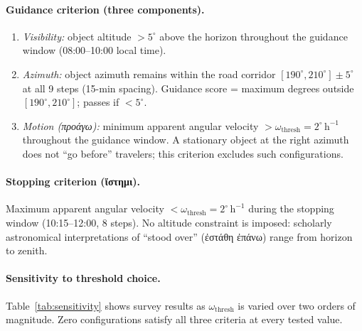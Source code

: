 \documentclass[11pt,a4paper]{article}
\newcommand{\grk}[1]{{\fontencoding{LGR}\selectfont #1}}
\newcommand{\grk}[1]{{\greekfont #1}}
\begin{document}
\paragraph{Guidance criterion (three components).}
\begin{enumerate}
  \item \textit{Visibility:} object altitude $> 5^\circ$ above the horizon
    throughout the guidance window (08:00--10:00 local time).
  \item \textit{Azimuth:} object azimuth remains within the road corridor
    $[190^\circ, 210^\circ] \pm 5^\circ$ at all 9 steps (15-min spacing).
    Guidance score = maximum degrees outside $[190^\circ, 210^\circ]$;
    passes if $< 5^\circ$.
  \item \textit{Motion (\grk{προάγω}):} minimum apparent angular velocity
    $> \omega_\mathrm{thresh} = 2^\circ\,\mathrm{h}^{-1}$ throughout the
    guidance window. A stationary object at the right azimuth does not
    ``go before'' travelers; this criterion excludes such configurations.
\end{enumerate}

\paragraph{Stopping criterion (\grk{ἵστημι}).}
Maximum apparent angular velocity $< \omega_\mathrm{thresh} =
2^\circ\,\mathrm{h}^{-1}$ during the stopping window (10:15--12:00, 8 steps).
No altitude constraint is imposed: scholarly astronomical interpretations of
``stood over'' (\grk{ἐστάθη ἐπάνω}) range from horizon to zenith.

\paragraph{Sensitivity to threshold choice.}
Table~\ref{tab:sensitivity} shows survey results as $\omega_\mathrm{thresh}$
is varied over two orders of magnitude. Zero configurations satisfy all
three criteria at every tested value.
\end{document}
